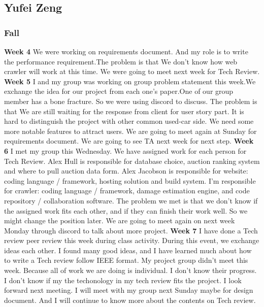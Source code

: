 \documentclass[onecolumn, draftclsnofoot, 10pt, compsoc]{IEEEtran}
\begin{document}
\subsection{Yufei Zeng}
\subsubsection{Fall}
\textbf{Week 4}
We were working on requirements document. And my role is to write the performance requirement.The problem is that We don’t know how web crawler will work at this time. We were going to meet next week for Tech Review.
\newline
\textbf{Week 5}
I and my group was working on group problem statement this week.We exchange the idea for our project from each one's paper.One of our group member has a bone fracture. So we were using discord to discuss. The problem is that We are still waiting for the response from client for user story part. It is hard to distinguish the project with other common used-car side. We need some more notable features to attract users. We are going to meet again at Sunday for requirements document.
We are going to see TA next week for next step.
\newline
\textbf{Week 6}
I met my group this Wednesday. We have assigned work for each person for Tech Review.  Alex Hull is responsible for database choice, auction ranking system and where to pull auction data form.  Alex Jacobson is responsible for website: coding language / framework, hosting solution and build system. I'm responsible for crawler: coding language / framework, damage estimation engine, and code repository / collaboration software. The problem we met is that we don't know if the assigned work fits each other, and if they can finish their work well. So we might change the position later. We are going to meet again on next week Monday through discord to talk about more project.
\newline
\textbf{Week 7}
I have done a Tech review peer review this week during class activity. During this event, we exchange ideas each other. I found many good ideas, and I have learned much about how to write a Tech review  follow IEEE format. My project group didn't meet this week. Because all of work we are doing is individual. I don't know their progress. I don't know if my the techonology in my tech review fits the project. I look forward next meeting. I will meet with my group next Sunday maybe for design document.  And I will continue to know more about the contents on Tech review.
\newline
\end{document}

